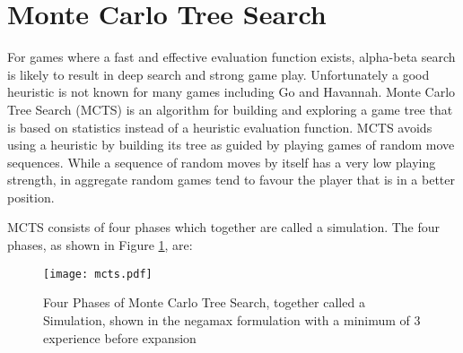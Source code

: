 






\section{Monte Carlo Tree Search}

For games where a fast and effective evaluation function exists, alpha-beta search is likely to result in deep search and strong game play. Unfortunately  a good heuristic is not known for many games including Go and Havannah. Monte Carlo Tree Search (MCTS) is an algorithm for building and exploring a game tree that is based on statistics instead of a heuristic evaluation function. MCTS avoids using a heuristic by building its tree as guided by playing games of random move sequences. While a sequence of random moves by itself has a very low playing strength, in aggregate random games tend to favour the player that is in a better position.

MCTS consists of four phases which together are called a simulation. The four phases, as shown in Figure \ref{fig:mcts}, are:

\begin{figure}
	\centering

\texttt{[image: mcts.pdf]}
%

\caption[Four Phases of Monte Carlo Tree Search]{Four Phases of Monte Carlo Tree Search, together called a Simulation, shown in the negamax formulation with a minimum of 3 experience before expansion}
\label{fig:mcts}
\end{figure}

